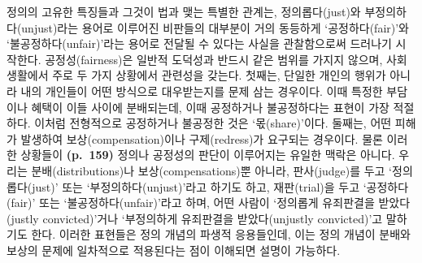 정의의 고유한 특징들과 그것이 법과 맺는 특별한 관계는, 정의롭다(just)와
부정의하다(unjust)라는 용어로 이루어진 비판들의 대부분이 거의 동등하게
`공정하다(fair)'와 `불공정하다(unfair)'라는 용어로 전달될 수 있다는
사실을 관찰함으로써 드러나기 시작한다. 공정성(fairness)은 일반적
도덕성과 반드시 같은 범위를 가지지 않으며, 사회생활에서 주로 두 가지
상황에서 관련성을 갖는다. 첫째는, 단일한 개인의 행위가 아니라
 내의 개인들이 어떤 방식으로 대우받는지를 문제 삼는
경우이다. 이때 특정한 부담이나 혜택이 이들 사이에 분배되는데, 이때
공정하거나 불공정하다는 표현이 가장 적절하다. 이처럼 전형적으로
공정하거나 불공정한 것은 `몫(share)'이다. 둘째는, 어떤 피해가 발생하여
보상(compensation)이나 구제(redress)가 요구되는 경우이다. 물론 이러한
상황들이 \textbf{(p.~159)} 정의나 공정성의 판단이 이루어지는 유일한
맥락은 아니다. 우리는 분배(distributions)나 보상(compensations)뿐
아니라, 판사(judge)를 두고 `정의롭다(just)' 또는
`부정의하다(unjust)'라고 하기도 하고, 재판(trial)을 두고
`공정하다(fair)' 또는 `불공정하다(unfair)'라고 하며, 어떤 사람이
`정의롭게 유죄판결을 받았다(justly convicted)'거나 `부정의하게
유죄판결을 받았다(unjustly convicted)'고 말하기도 한다. 이러한 표현들은
정의 개념의 파생적 응용들인데, 이는 정의 개념이 분배와 보상의 문제에
일차적으로 적용된다는 점이 이해되면 설명이 가능하다.

